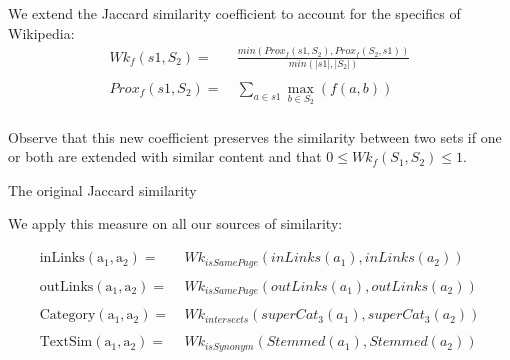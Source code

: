\documentclass[xcolor=dvipsnames]{beamer}
\newcommand{\textSim}[2]{\mathrm{TextSim(#1,#2)}}
\newcommand{\inLinks}[2]{\mathrm{inLinks(#1,#2)}}
\newcommand{\outLinks}[2]{\mathrm{outLinks(#1,#2)}}
\newcommand{\category}[2]{\mathrm{Category(#1,#2)}}
\newcommand{\wikiJack}[3]{Wk_{#1}(#2,#3)}
\newcommand{\setProximity}[3]{Prox_{#1}(#2,#3)}
\begin{document}



\begin{frame}
We extend the Jaccard similarity coefficient to account for the specifics of Wikipedia:
\begin{align*}	
\wikiJack{f}{s1}{S_2} =&\ \frac{min(\setProximity{f}{s1}{S_2}, \setProximity{f}{S_2}{s1})}{min(|s1|,|S_2|)}\\
\\
\setProximity{f}{s1}{S_2} =&\ \sum\limits_{a \in s1} \max\limits_{b \in S_2}(f(a,b))\\
\end{align*}

Observe that this new coefficient preserves the similarity between two sets if one or both are extended with similar content and that $ 0 \leq \wikiJack{f}{S_1}{S_2} \leq 1 $.

\begin{block}{The original Jaccard similarity}
$$$$
\end{block}
\end{frame}


\begin{frame}

We apply this measure on all our sources of similarity: 

\begin{align*}
	\inLinks{a_1}{a_2} =&\ \wikiJack{isSamePage}{inLinks(a_1)}{inLinks(a_2)}\\
	\\
	\outLinks{a_1}{a_2} =&\ \wikiJack{isSamePage}{outLinks(a_1)}{outLinks(a_2)}\\
	\\
	\category{a_1}{a_2} =&\  \wikiJack{intersects}{superCat_3(a_1)}{superCat_3(a_2)}\\
	\\
	\textSim{a_1}{a_2} =&\  \wikiJack{isSynonym}{Stemmed(a_1)}{Stemmed(a_2)}\\
\end{align*}
\end{frame}
\end{document}
